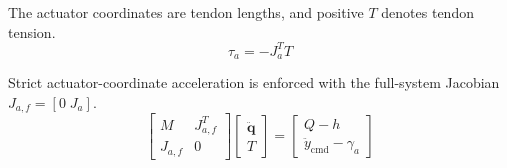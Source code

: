 \documentclass[11pt]{article}
\begin{document}
The actuator coordinates are tendon lengths, and positive $T$ denotes tendon tension.
\begin{equation}
\tau_a=-J_a^TT
\end{equation}

Strict actuator-coordinate acceleration is enforced with the full-system Jacobian $J_{a,f}=[0\;J_a]$.
\begin{equation}
\begin{bmatrix}M&J_{a,f}^{T}\\J_{a,f}&0\end{bmatrix}\begin{bmatrix}\ddot{\boldsymbol q}\\T\end{bmatrix}=\begin{bmatrix}Q-h\\\ddot y_{\mathrm{cmd}}-\gamma_a\end{bmatrix}
\end{equation}
\end{document}
